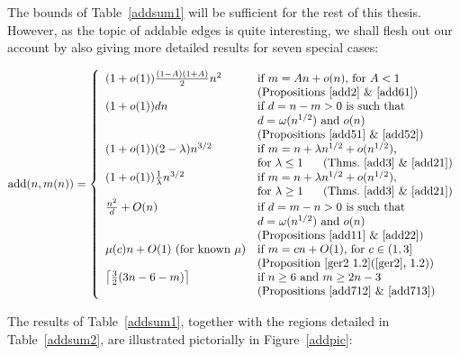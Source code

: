 \documentclass{article}
\newtheorem{Proof of Theorem}{Proof of Theorem}
\begin{document}
The bounds of Table~\ref{addsum1} will be sufficient for the rest of this thesis.
However,
as the topic of addable edges is quite interesting,
we shall flesh out our account by also giving more detailed results for seven special cases: 
\begin{table} [ht] 
\begin{displaymath}
\textrm{add}(n,m(n)) = 
\left\{ \begin{array}{ll}
(1+o(1)) \frac{(1-A)(1+A)}{2}n^{2} & \textrm{if $m = An + o(n)$, for $A<1$} \\
& \textrm{(Propositions~\ref{add2} \&~\ref{add61})} \\
(1+o(1)) dn & \textrm{if $d=n-m>0$ is such that} \\
& d=\omega(n^{1/2}) \textrm{ and } o(n) \\
& \textrm{(Propositions~\ref{add51} \&~\ref{add52})} \\
(1+o(1)) (2 - \lambda) n^{3/2} 
& \textrm{if $m=n+ \lambda n^{1/2} +o(n^{1/2})$,} \\
& \textrm{for $\lambda \leq 1$ \phantom{qq} (Thms.~\ref{add3} \&~\ref{add21})} \\
(1+o(1)) \frac{1}{\lambda} n^{3/2} & 
\textrm{if $m=n+ \lambda n^{1/2} +o(n^{1/2})$,} \\
& \textrm{for $\lambda \geq 1$ \phantom{qq} (Thms.~\ref{add3} \&~\ref{add21})} \\
\frac{n^{2}}{d} + O(n) & \textrm{if $d=m-n>0$ is such that} \\
& d=\omega(n^{1/2}) \textrm{ and } o(n) \\
& \textrm{(Propositions~\ref{add11} \&~\ref{add22})} \\
\mu(c)n+O(1) \textrm{ (for known $\mu$)} 
& \textrm{if $m=cn+O(1)$, for $c \in (1,3]$} \\
& \textrm{(Proposition~\ref{ger2 1.2}(\cite{ger2}, 1.2))} \\
\left \lceil \frac{3}{2} (3n-6-m) \right \rceil 
& \textrm{if $n \geq 6$ and $m \geq 2n-3$} \\
& \textrm{(Propositions~\ref{add712} \&~\ref{add713})}
\end{array} \right. 
\end{displaymath} 
\caption{Seven secondary addability results.} \label{addsum2}
\end{table}









The results of Table~\ref{addsum1},
together with the regions detailed in Table~\ref{addsum2},
are illustrated pictorially in Figure~\ref{addpic}:
\end{document}
